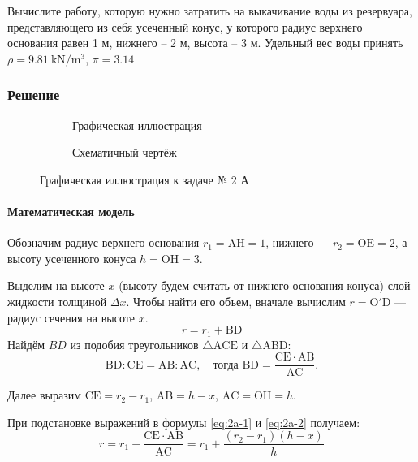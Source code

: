 \documentclass[a4paper,12pt]{article}
\begin{document}
Вычислите работу, которую нужно затратить на выкачивание воды из резервуара,
представляющего из себя усеченный конус,
у которого радиус верхнего основания равен 1 м, нижнего – 2 м, высота – 3 м.
Удельный вес воды принять \(\rho = \SI{9.81}{\kN\per\cubic\metre}\),
\(\pi = \num{3.14}\)

\subsubsection{Решение}

\begin{figure}[htbp]
  \centering
  \begin{subfigure}[b]{0.47\textwidth}
    \centering
    \caption{Графическая иллюстрация}
  \end{subfigure}
  \hfill
  \begin{subfigure}[b]{0.47\textwidth}
    \centering
    \caption{Схематичный чертёж}
  \end{subfigure}
  \caption{Графическая иллюстрация к задаче № 2 А}
\end{figure}

\paragraph{Математическая модель}

Обозначим радиус верхнего основания \(r_1 = \mathrm{AH} = 1\),
нижнего --- \(r_2 = \mathrm{OE} = 2\),
а высоту усеченного конуса \(h = \mathrm{OH} = 3\).

Выделим на высоте \(x\) (высоту будем считать от нижнего основания конуса)
слой жидкости толщиной \(\Delta x\).
Чтобы найти его объем,
вначале вычислим \(r = \mathrm{O'D}\) --- радиус сечения на высоте \(x\).
\begin{equation}\label{eq:2a-1}
  r = r_1 + \mathrm{BD}
\end{equation}
Найдём \(BD\) из подобия треугольников
\(\triangle \mathrm{ACE}\) и \(\triangle \mathrm{ABD}\):
\begin{equation}\label{eq:2a-2}
  \mathrm{BD} : \mathrm{CE} = \mathrm{AB} : \mathrm{AC},
  \quad\text{тогда }
  \mathrm{BD} = \frac{\mathrm{CE} \cdot \mathrm{AB}}{\mathrm{AC}}.
\end{equation}

Далее выразим
\(\mathrm{CE} = r_2 - r_1\),
\(\mathrm{AB} = h - x\),
\(\mathrm{AC} = \mathrm{OH} = h\).

При подстановке выражений в формулы \ref{eq:2a-1} и \ref{eq:2a-2} получаем:
\[
  r = r_1 + \frac{\mathrm{CE} \cdot \mathrm{AB}}{\mathrm{AC}}
    = r_1 + \frac{(r_2 - r_1)(h - x)}{h}
\]
\end{document}
